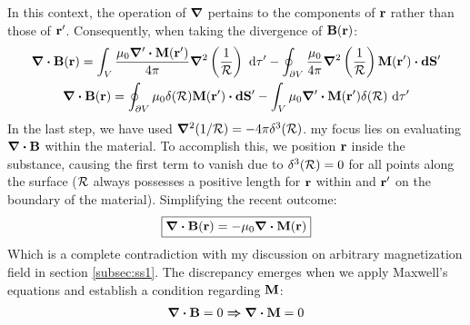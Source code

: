 \documentclass{article}
\numberwithin{equation}{section}
\begin{document}
In this context, the operation of $\grad$ pertains to the components of $\vb{r}$ rather than those of $\vb{r'}$. Consequently, when taking the divergence of $\vb{B}(\vb{r})$:
\begin{gather}
\div\vb{B}(\vb{r})=\int_V \frac{\mu_0 \grad'\vdot\vb{M}(\vb{r'})}{4\pi}\grad^2\left(\frac{1}{\mathcal{R}}\right)\ \dd\tau' - \oint_{\partial V} \frac{\mu_0 }{4\pi}\grad^2\left(\frac{1}{\mathcal{R}}\right)\vb{M}(\vb{r'})\vdot\vb{dS'}\nonumber\\\div\vb{B}(\vb{r})=\oint_{\partial V} \mu_0 \delta(\vb{\mathcal{R}}) \vb{M}(\vb{r'})\vdot\vb{dS'}-\int_V \mu_0 \grad'\vdot\vb{M}(\vb{r'}) \delta(\vb{\mathcal{R}}) \ \dd\tau'\label{eqn:eq32}
\end{gather}
In the last step, we have used $\grad^2(1/\mathcal{R})=-4\pi\delta^3(\vb{\mathcal{R}})$. my focus lies on evaluating $\div\vb{B}$ within the material. To accomplish this, we position $\vb{r}$ inside the substance, causing the first term to vanish due to $\delta^3(\vb{\mathcal{R}})=0$ for all points along the surface ($\vb{\mathcal{R}}$ always possesses a positive length for $\vb{r}$ within and $\vb{r'}$ on the boundary of the material). Simplifying the recent outcome:
\begin{gather}
\boxed{\div\vb{B}(\vb{r})=-\mu_0\div\vb{M}(\vb{r})}\label{eqn:eq33}
\end{gather}
Which is a complete contradiction with my discussion on arbitrary magnetization field in section \ref{subsec:ss1}. The discrepancy emerges when we apply Maxwell's equations and establish a condition regarding $\vb{M}$:
\begin{gather}
\div\vb{B}=0\bm{\Rightarrow}\div\vb{M}=0\label{eqn:eq34}
\end{gather}
\end{document}
